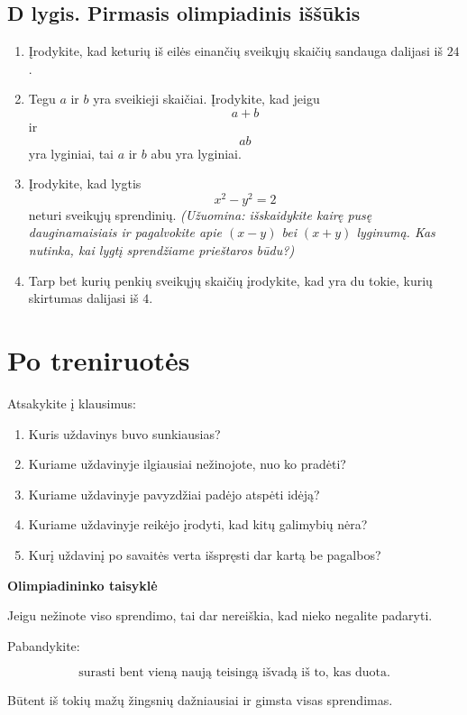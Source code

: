 \documentclass[11pt,a4paper]{scrartcl}
\begin{document}
\subsection{D lygis. Pirmasis olimpiadinis iššūkis}

\begin{enumerate}
    \renewcommand{\labelenumi}{\textbf{\theenumi.}}
    \setcounter{enumi}{16}

    \item Įrodykite, kad keturių iš eilės einančių sveikųjų skaičių
    sandauga dalijasi iš $24$.

    \item Tegu $a$ ir $b$ yra sveikieji skaičiai. Įrodykite, kad jeigu
    \[
    a+b
    \]
    ir
    \[
    ab
    \]
    yra lyginiai, tai $a$ ir $b$ abu yra lyginiai.

    \item Įrodykite, kad lygtis
    \[
    x^2-y^2=2
    \]
    neturi sveikųjų sprendinių. 
    \textit{(Užuomina: išskaidykite kairę pusę dauginamaisiais ir pagalvokite apie $(x-y)$ bei $(x+y)$ lyginumą. Kas nutinka, kai lygtį sprendžiame prieštaros būdu?)}

    \item Tarp bet kurių penkių sveikųjų skaičių įrodykite, kad yra du
    tokie, kurių skirtumas dalijasi iš $4$.
\end{enumerate}

\section{Po treniruotės}

Atsakykite į klausimus:

\begin{enumerate}
    \renewcommand{\labelenumi}{\textbf{\theenumi.}}

    \item Kuris uždavinys buvo sunkiausias?
    \item Kuriame uždavinyje ilgiausiai nežinojote, nuo ko pradėti?
    \item Kuriame uždavinyje pavyzdžiai padėjo atspėti idėją?
    \item Kuriame uždavinyje reikėjo įrodyti, kad kitų galimybių nėra?
    \item Kurį uždavinį po savaitės verta išspręsti dar kartą be pagalbos?
\end{enumerate}

\bigskip

\begin{center}
\textbf{Olimpiadininko taisyklė}
\end{center}

Jeigu nežinote viso sprendimo, tai dar nereiškia, kad nieko negalite
padaryti.

Pabandykite:

\[
\boxed{\text{surasti bent vieną naują teisingą išvadą iš to, kas duota.}}
\]

Būtent iš tokių mažų žingsnių dažniausiai ir gimsta visas sprendimas.
\end{document}
